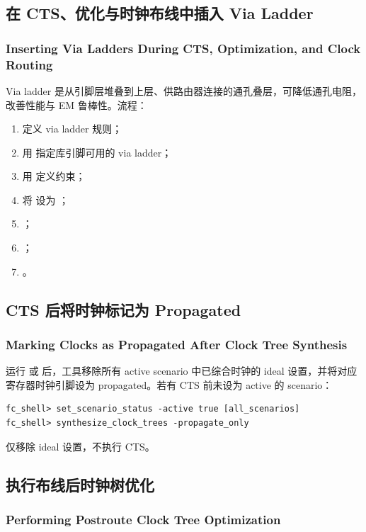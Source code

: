 \subsection{在 CTS、优化与时钟布线中插入 Via Ladder}
\subsubsection*{Inserting Via Ladders During CTS, Optimization, and Clock Routing}

Via ladder 是从引脚层堆叠到上层、供路由器连接的通孔叠层，可降低通孔电阻，改善性能与 EM 鲁棒性。流程：
\begin{enumerate}
  \item 定义 via ladder 规则；
  \item 用  指定库引脚可用的 via ladder；
  \item 用  定义约束；
  \item 将  设为 ；
  \item {}；
  \item {}；
  \item {}。
\end{enumerate}

\subsection{CTS 后将时钟标记为 Propagated}
\subsubsection*{Marking Clocks as Propagated After Clock Tree Synthesis}

运行  或  后，工具移除所有 active scenario 中已综合时钟的 ideal 设置，并将对应寄存器时钟引脚设为 propagated。若有 CTS 前未设为 active 的 scenario：
\begin{lstlisting}
fc_shell> set_scenario_status -active true [all_scenarios]
fc_shell> synthesize_clock_trees -propagate_only
\end{lstlisting}
 仅移除 ideal 设置，不执行 CTS。

\subsection{执行布线后时钟树优化}
\subsubsection*{Performing Postroute Clock Tree Optimization}

